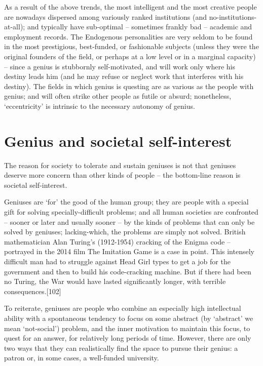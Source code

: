 \documentclass[
]{book}
\begin{document}
As a result of the above trends, the most intelligent and the most creative people are nowadays dispersed among variously ranked institutions (and no-institutions-at-all); and typically have sub-optimal -- sometimes frankly bad -- academic and employment records. The Endogenous personalities are very seldom to be found in the most prestigious, best-funded, or fashionable subjects (unless they were the original founders of the field, or perhaps at a low level or in a marginal capacity) -- since a genius is stubbornly self-motivated, and will work only where his destiny leads him (and he may refuse or neglect work that interferes with his destiny). The fields in which genius is questing are as various as the people with genius; and will often strike other people as futile or absurd; nonetheless, `eccentricity' is intrinsic to the necessary autonomy of genius.

\hypertarget{genius-and-societal-self-interest}{%
\section{Genius and societal self-interest}\label{genius-and-societal-self-interest}}

The reason for society to tolerate and sustain geniuses is not that geniuses deserve more concern than other kinds of people -- the bottom-line reason is societal self-interest.

Geniuses are `for' the good of the human group; they are people with a special gift for solving specially-difficult problems; and all human societies are confronted -- sooner or later and usually sooner -- by the kinds of problems that can only be solved by geniuses; lacking-which, the problems are simply not solved. British mathematician Alan Turing's (1912-1954) cracking of the Enigma code -- portrayed in the 2014 film The Imitation Game is a case in point. This intensely difficult man had to struggle against Head Girl types to get a job for the government and then to build his code-cracking machine. But if there had been no Turing, the War would have lasted significantly longer, with terrible consequences.{[}102{]}

To reiterate, geniuses are people who combine an especially high intellectual ability with a spontaneous tendency to focus on some abstract (by `abstract' we mean `not-social') problem, and the inner motivation to maintain this focus, to quest for an answer, for relatively long periods of time. However, there are only two ways that they can realistically find the space to pursue their genius: a patron or, in some cases, a well-funded university.
\end{document}
